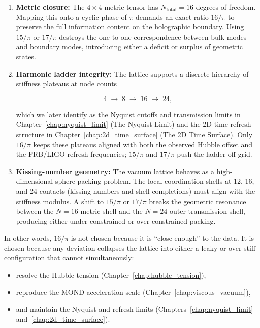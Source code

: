 \documentclass[11pt, letterpaper, openany]{book}
\begin{document}
\begin{enumerate}
    \item \textbf{Metric closure:} The $4 \times 4$ metric tensor has $N_{\text{total}} = 16$ degrees of freedom.
    Mapping this onto a cyclic phase of $\pi$ demands an exact ratio $16/\pi$ to preserve
    the full information content on the holographic boundary. Using $15/\pi$ or $17/\pi$
    destroys the one-to-one correspondence between bulk modes and boundary modes,
    introducing either a deficit or surplus of geometric states.

    \item \textbf{Harmonic ladder integrity:} The lattice supports a discrete hierarchy of
    stiffness plateaus at node counts
    

\[
        4 \;\rightarrow\; 8 \;\rightarrow\; 16 \;\rightarrow\; 24,
    \]


    which we later identify as the Nyquist cutoffs and transmission limits in
    Chapter~\ref{chap:nyquist_limit} (The Nyquist Limit) and the 2D time refresh structure
    in Chapter~\ref{chap:2d_time_surface} (The 2D Time Surface).
    Only $16/\pi$ keeps these plateaus aligned with both the observed Hubble offset
    and the FRB/LIGO refresh frequencies; $15/\pi$ and $17/\pi$ push the ladder off-grid.

    \item \textbf{Kissing-number geometry:} The vacuum lattice behaves as a high-dimensional
    sphere packing problem. The local coordination shells at 12, 16, and 24 contacts
    (kissing numbers and shell completions) must align with the stiffness modulus.
    A shift to $15/\pi$ or $17/\pi$ breaks the geometric resonance between the
    $N=16$ metric shell and the $N=24$ outer transmission shell, producing either
    under-constrained or over-constrained packing.
\end{enumerate}

In other words, $16/\pi$ is not chosen because it is ``close enough'' to the data.
It is chosen because any deviation collapses the lattice into either a leaky or over‑stiff
configuration that cannot simultaneously:

\begin{itemize}
    \item resolve the Hubble tension (Chapter~\ref{chap:hubble_tension}),
    \item reproduce the MOND acceleration scale (Chapter~\ref{chap:viscous_vacuum}),
    \item and maintain the Nyquist and refresh limits (Chapters~\ref{chap:nyquist_limit}
          and~\ref{chap:2d_time_surface}).
\end{itemize}
\end{document}
